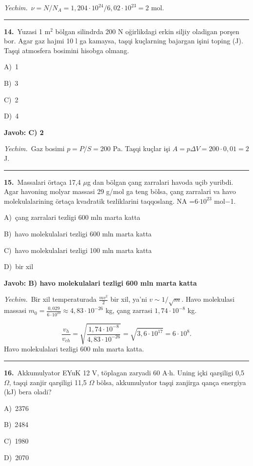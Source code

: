 \documentclass[11pt,a4paper]{article}
\newcommand{\opt}[2]{\hspace*{4mm}#1)\ #2\par}
\begin{document}
\noindent\textit{Yechim.}\ $\nu=N/N_A=1{,}204\cdot10^{24}/6{,}02\cdot10^{23}=2$ mol.\par\par\medskip\hrule\medskip
{}\noindent\begin{minipage}{\linewidth}
\textbf{14.}\ Yuzasi 1 m$^{2}$ bölgan silindrda 200 N oğirlikdagi erkin siljiy oladigan porşen bor. Agar gaz hajmi 10 l ga kamaysa, taşqi kuçlarning bajargan işini toping (J). Taşqi atmosfera bosimini hisobga olmang.\par\smallskip
\opt{A}{1}
\opt{B}{3}
\opt{C}{2}
\opt{D}{4}
\end{minipage}\vspace{2pt}\par
\noindent\colorbox{gray!12}{\parbox{\dimexpr\linewidth-2\fboxsep}{\textbf{Javob: C) 2}}}\par\smallskip
\noindent\textit{Yechim.}\ Gaz bosimi $p=P/S=200$ Pa. Taşqi kuçlar işi $A=p\Delta V=200\cdot0{,}01=2$ J.\par\par\medskip\hrule\medskip
{}\noindent\begin{minipage}{\linewidth}
\textbf{15.}\ Massalari örtaça 17,4 $\mu$g dan bölgan çang zarralari havoda uçib yuribdi. Agar havoning molyar massasi 29 g/mol ga teng bölsa, çang zarralari va havo molekulalarining örtaça kvadratik tezliklarini taqqoslang. NA =6$\cdot10^{23}$ mol$-$1.\par\smallskip
\opt{A}{çang zarralari tezligi 600 mln marta katta}
\opt{B}{havo molekulalari tezligi 600 mln marta katta}
\opt{C}{havo molekulalari tezligi 100 mln marta katta}
\opt{D}{bir xil}
\end{minipage}\vspace{2pt}\par
\noindent\colorbox{gray!12}{\parbox{\dimexpr\linewidth-2\fboxsep}{\textbf{Javob: B) havo molekulalari tezligi 600 mln marta katta}}}\par\smallskip
\noindent\textit{Yechim.}\ Bir xil temperaturada $\frac{mv^2}{2}$ bir xil, ya’ni $v\sim1/\sqrt m$. Havo molekulasi massasi $m_0=\frac{0{,}029}{6\cdot10^{23}}\approx4{,}83\cdot10^{-26}$ kg, çang zarrasi $1{,}74\cdot10^{-8}$ kg.\par
\[\frac{v_h}{v_{ch}}=\sqrt{\frac{1{,}74\cdot10^{-8}}{4{,}83\cdot10^{-26}}}=\sqrt{3{,}6\cdot10^{17}}=6\cdot10^8.\]
Havo molekulalari tezligi 600 mln marta katta.\par\par\medskip\hrule\medskip
{}\noindent\begin{minipage}{\linewidth}
\textbf{16.}\ Akkumulyator EYuK 12 V, töplagan zaryadi 60 A$\cdot$h. Uning içki qarşiligi 0,5 $\Omega$, taşqi zanjir qarşiligi 11,5 $\Omega$ bölsa, akkumulyator taşqi zanjirga qança energiya (kJ) bera oladi?\par\smallskip
\opt{A}{2376}
\opt{B}{2484}
\opt{C}{1980}
\opt{D}{2070}
\end{minipage}\vspace{2pt}\par
\end{document}
